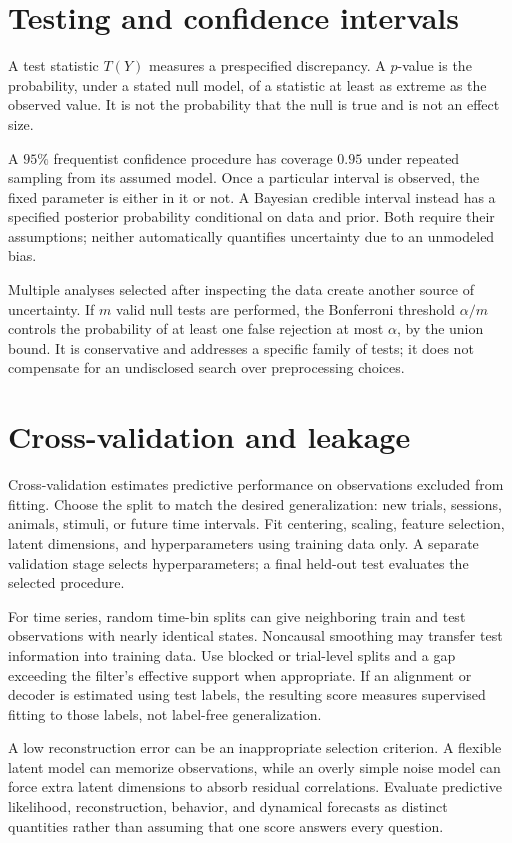 \section{Testing and confidence intervals}
A test statistic \(T(Y)\) measures a prespecified discrepancy. A \(p\)-value is the probability, under a stated null model, of a statistic at least as extreme as the observed value. It is not the probability that the null is true and is not an effect size.

A \(95\%\) frequentist confidence procedure has coverage \(0.95\) under repeated sampling from its assumed model. Once a particular interval is observed, the fixed parameter is either in it or not. A Bayesian credible interval instead has a specified posterior probability conditional on data and prior. Both require their assumptions; neither automatically quantifies uncertainty due to an unmodeled bias.

Multiple analyses selected after inspecting the data create another source of uncertainty. If \(m\) valid null tests are performed, the Bonferroni threshold \(\alpha/m\) controls the probability of at least one false rejection at most \(\alpha\), by the union bound. It is conservative and addresses a specific family of tests; it does not compensate for an undisclosed search over preprocessing choices.

\section{Cross-validation and leakage}
Cross-validation estimates predictive performance on observations excluded from fitting. Choose the split to match the desired generalization: new trials, sessions, animals, stimuli, or future time intervals. Fit centering, scaling, feature selection, latent dimensions, and hyperparameters using training data only. A separate validation stage selects hyperparameters; a final held-out test evaluates the selected procedure.

For time series, random time-bin splits can give neighboring train and test observations with nearly identical states. Noncausal smoothing may transfer test information into training data. Use blocked or trial-level splits and a gap exceeding the filter's effective support when appropriate. If an alignment or decoder is estimated using test labels, the resulting score measures supervised fitting to those labels, not label-free generalization.

A low reconstruction error can be an inappropriate selection criterion. A flexible latent model can memorize observations, while an overly simple noise model can force extra latent dimensions to absorb residual correlations. Evaluate predictive likelihood, reconstruction, behavior, and dynamical forecasts as distinct quantities rather than assuming that one score answers every question.

